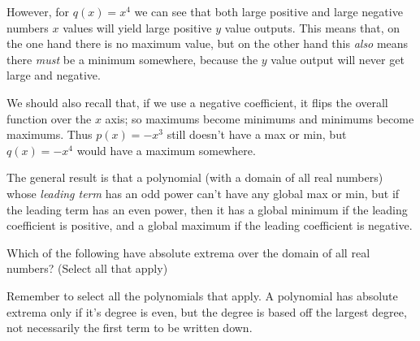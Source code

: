 \documentclass{ximera}
\begin{document}
However, for $q(x) = x^4$ we can see that both large positive and large negative numbers $x$ values will yield large positive $y$ value outputs. This means that, on the one hand there is no maximum value, but on the other hand this \textit{also} means there \textit{must} be a minimum somewhere, because the $y$ value output will never get large and negative.

We should also recall that, if we use a negative coefficient, it flips the overall function over the $x$ axis; so maximums become minimums and minimums become maximums. Thus $p(x) = -x^3$ still doesn't have a max or min, but $q(x) = -x^4$ would have a maximum somewhere.

The general result is that a polynomial (with a domain of all real numbers) whose \textit{leading term} has an odd power can't have any global max or min, but if the leading term has an even power, then it has a global minimum if the leading coefficient is positive, and a global maximum if the leading coefficient is negative.

\begin{problem}
    Which of the following have absolute extrema over the domain of all real numbers? (Select all that apply)
    \begin{selectAll}
    \end{selectAll}
    \begin{feedback}
        Remember to select all the polynomials that apply. A polynomial has absolute extrema only if it's degree is even, but the degree is based off the largest degree, not necessarily the first term to be written down.
    \end{feedback}
\end{problem}
\end{document}
